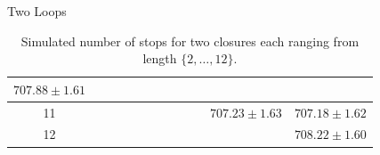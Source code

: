 \documentclass[hyphens,aspectratio=169]{beamer}
\begin{document}
\begin{frame}[fragile]{Two Loops}
\begin{table}[H]
\begin{adjustbox}{max width=\textwidth}
\begin{tabular}{|c|c|c|c|c|c|c|c|c|c|c|c|}
				$707.88 \pm 1.61$                                                                                                                                                                                                                             \\
				\hline
				11                &                   &                   &                   &                   &                   &                   &                   &                   &                   & $707.23 \pm 1.63$ & $707.18 \pm 1.62$ \\
				\hline
				12                &                   &                   &                   &                   &                   &                   &                   &                   &                   &                   & $708.22 \pm 1.60$ \\
				\hline
			\end{tabular}
		\end{adjustbox}
		\caption{Simulated number of stops for two closures each ranging
			from length $\{2,\dots,12\}$.}
	\end{table}

\end{frame}






\end{document}
